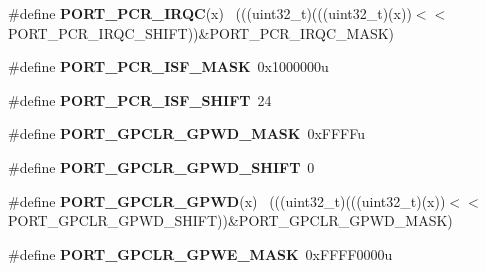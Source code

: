\begin{DoxyCompactItemize}
\item 
\hypertarget{group___p_o_r_t___register___masks_gadbd5b173d13c0766ed34cb90095ba789}{}\#define {\bfseries P\+O\+R\+T\+\_\+\+P\+C\+R\+\_\+\+I\+R\+Q\+C}(x)                                              ~(((uint32\+\_\+t)(((uint32\+\_\+t)(x))$<$$<$P\+O\+R\+T\+\_\+\+P\+C\+R\+\_\+\+I\+R\+Q\+C\+\_\+\+S\+H\+I\+F\+T))\&P\+O\+R\+T\+\_\+\+P\+C\+R\+\_\+\+I\+R\+Q\+C\+\_\+\+M\+A\+S\+K)\label{group___p_o_r_t___register___masks_gadbd5b173d13c0766ed34cb90095ba789}

\item 
\hypertarget{group___p_o_r_t___register___masks_ga154d9308c2ab5b6a78ab04d9f3b08879}{}\#define {\bfseries P\+O\+R\+T\+\_\+\+P\+C\+R\+\_\+\+I\+S\+F\+\_\+\+M\+A\+S\+K}~0x1000000u\label{group___p_o_r_t___register___masks_ga154d9308c2ab5b6a78ab04d9f3b08879}

\item 
\hypertarget{group___p_o_r_t___register___masks_ga5fbf95753704fb1d71da88299c11105e}{}\#define {\bfseries P\+O\+R\+T\+\_\+\+P\+C\+R\+\_\+\+I\+S\+F\+\_\+\+S\+H\+I\+F\+T}~24\label{group___p_o_r_t___register___masks_ga5fbf95753704fb1d71da88299c11105e}

\item 
\hypertarget{group___p_o_r_t___register___masks_gaa7e4a890e9d09d85279889ce3ecb0044}{}\#define {\bfseries P\+O\+R\+T\+\_\+\+G\+P\+C\+L\+R\+\_\+\+G\+P\+W\+D\+\_\+\+M\+A\+S\+K}~0x\+F\+F\+F\+Fu\label{group___p_o_r_t___register___masks_gaa7e4a890e9d09d85279889ce3ecb0044}

\item 
\hypertarget{group___p_o_r_t___register___masks_gaafacaac0aa215f596b947609857d6491}{}\#define {\bfseries P\+O\+R\+T\+\_\+\+G\+P\+C\+L\+R\+\_\+\+G\+P\+W\+D\+\_\+\+S\+H\+I\+F\+T}~0\label{group___p_o_r_t___register___masks_gaafacaac0aa215f596b947609857d6491}

\item 
\hypertarget{group___p_o_r_t___register___masks_gab9daa192b3e0c7d1bf44689b960c5a4f}{}\#define {\bfseries P\+O\+R\+T\+\_\+\+G\+P\+C\+L\+R\+\_\+\+G\+P\+W\+D}(x)                                          ~(((uint32\+\_\+t)(((uint32\+\_\+t)(x))$<$$<$P\+O\+R\+T\+\_\+\+G\+P\+C\+L\+R\+\_\+\+G\+P\+W\+D\+\_\+\+S\+H\+I\+F\+T))\&P\+O\+R\+T\+\_\+\+G\+P\+C\+L\+R\+\_\+\+G\+P\+W\+D\+\_\+\+M\+A\+S\+K)\label{group___p_o_r_t___register___masks_gab9daa192b3e0c7d1bf44689b960c5a4f}

\item 
\hypertarget{group___p_o_r_t___register___masks_ga49c4160370859546837be80a2eed1365}{}\#define {\bfseries P\+O\+R\+T\+\_\+\+G\+P\+C\+L\+R\+\_\+\+G\+P\+W\+E\+\_\+\+M\+A\+S\+K}~0x\+F\+F\+F\+F0000u\label{group___p_o_r_t___register___masks_ga49c4160370859546837be80a2eed1365}


\end{DoxyCompactItemize}
